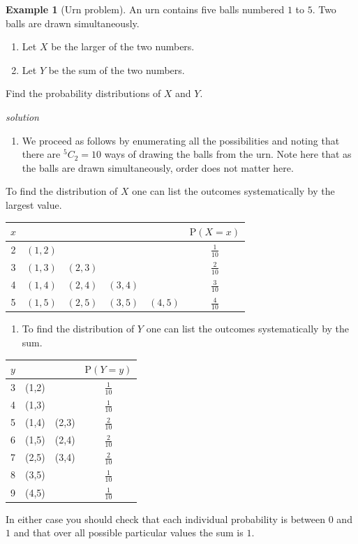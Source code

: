 \documentclass[
]{book}
\providecommand{\tightlist}{%
  \setlength{\itemsep}{0pt}\setlength{\parskip}{0pt}}
\theoremstyle{definition}
\theoremstyle{definition}
\newtheorem{example}{Example}[chapter]
\theoremstyle{definition}
\theoremstyle{definition}
\theoremstyle{remark}
\begin{document}
\begin{example}[Urn problem]
An urn contains five balls numbered \(1\) to \(5\). Two balls are drawn simultaneously.

\begin{enumerate}
\def\labelenumi{\arabic{enumi}.}
\item
  Let \(X\) be the larger of the two numbers.
\item
  Let \(Y\) be the sum of the two numbers.
\end{enumerate}

Find the probability distributions of \(X\) and \(Y\).

\emph{solution}

\begin{enumerate}
\def\labelenumi{\arabic{enumi}.}
\tightlist
\item
  We proceed as follows by enumerating all the possibilities and noting that there are \(^5C_2=10\) ways of drawing the balls from the urn. Note here that as the balls are drawn simultaneously, order does not matter here.
\end{enumerate}

To find the distribution of \(X\) one can list the outcomes systematically by the largest value.

\begin{longtable}[]{@{}cccccc@{}}
\toprule
\(x\) & & & & & \(\text{P}(X=x)\)\tabularnewline
\midrule
\endhead
2 & \((1,2)\) & & & & \(\frac{1}{10}\)\tabularnewline
3 & \((1,3)\) & \((2,3)\) & & & \(\frac{2}{10}\)\tabularnewline
4 & \((1,4)\) & \((2,4)\) & \((3,4)\) & & \(\frac{3}{10}\)\tabularnewline
5 & \((1,5)\) & \((2,5)\) & \((3,5)\) & \((4,5)\) & \(\frac{4}{10}\)\tabularnewline
\bottomrule
\end{longtable}

\begin{enumerate}
\def\labelenumi{\arabic{enumi}.}
\setcounter{enumi}{1}
\tightlist
\item
  To find the distribution of \(Y\) one can list the outcomes systematically by the sum.
\end{enumerate}

\begin{longtable}[]{@{}cccc@{}}
\toprule
\(y\) & & & \(\text{P}(Y=y)\)\tabularnewline
\midrule
\endhead
3 & (1,2) & & \(\frac{1}{10}\)\tabularnewline
4 & (1,3) & & \(\frac{1}{10}\)\tabularnewline
5 & (1,4) & (2,3) & \(\frac{2}{10}\)\tabularnewline
6 & (1,5) & (2,4) & \(\frac{2}{10}\)\tabularnewline
7 & (2,5) & (3,4) & \(\frac{2}{10}\)\tabularnewline
8 & (3,5) & & \(\frac{1}{10}\)\tabularnewline
9 & (4,5) & & \(\frac{1}{10}\)\tabularnewline
\bottomrule
\end{longtable}

In either case you should check that each individual probability is between \(0\) and \(1\) and that over all possible particular values the sum is \(1\).
\end{example}
\end{document}

